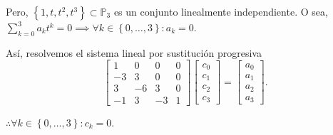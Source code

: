 \begin{frame}
    Pero,
    \begin{math}
        \left\{
        1,
        t,
        t^{2},
        t^{3}
        \right\}\subset\mathbb{P}_{3}
    \end{math}
    es un conjunto linealmente independiente.
    O sea,
    \begin{math}
        \sum\limits_{k=0}^{3}
        a_{k}
        t^{k}=
        0\implies
        \forall k\in\left\{0,\dotsc,3\right\}:
        a_{k}=0
    \end{math}.

    Así, resolvemos el sistema lineal por sustitución progresiva
    \begin{equation*}
        \begin{bmatrix}
            1  & 0  & 0  & 0 \\
            -3 & 3  & 0  & 0 \\
            3  & -6 & 3  & 0 \\
            -1 & 3  & -3 & 1
        \end{bmatrix}
        \begin{bmatrix}
            c_{0} \\
            c_{1} \\
            c_{2} \\
            c_{3}
        \end{bmatrix}=
        \begin{bmatrix}
            a_{0} \\
            a_{1} \\
            a_{2} \\
            a_{3}
        \end{bmatrix}.
    \end{equation*}

    \begin{math}
        \therefore
        \forall k\in\left\{0,\dotsc,3\right\}:
        c_{k}=0
    \end{math}.
\end{frame}